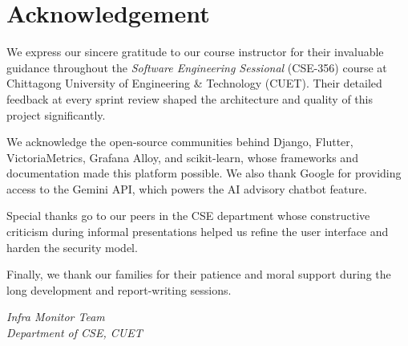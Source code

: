 \chapter*{Acknowledgement}

We express our sincere gratitude to our course instructor for their invaluable
guidance throughout the \textit{Software Engineering Sessional} (CSE-356) course
at Chittagong University of Engineering \& Technology (CUET).  Their detailed
feedback at every sprint review shaped the architecture and quality of this
project significantly.

We acknowledge the open-source communities behind Django, Flutter, VictoriaMetrics,
Grafana Alloy, and scikit-learn, whose frameworks and documentation made this
platform possible.  We also thank Google for providing access to the Gemini API,
which powers the AI advisory chatbot feature.

Special thanks go to our peers in the CSE department whose constructive
criticism during informal presentations helped us refine the user interface and
harden the security model.

Finally, we thank our families for their patience and moral support during the
long development and report-writing sessions.

\vspace{2cm}
\noindent\textit{Infra Monitor Team}\\
\textit{Department of CSE, CUET}\\
\textit{\SubmissionDate}

